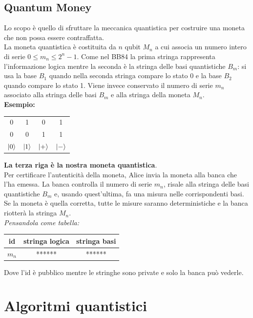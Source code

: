 \documentclass[12pt, a4paper]{report}
\begin{document}
\section{Quantum Money}
Lo scopo è quello di sfruttare la meccanica quantistica per costruire una moneta che non possa essere contraffatta.\\
La moneta quantistica è costituita da $n$ qubit $M_{n}$ a cui associa un numero intero di serie $0\leq m_{n} \leq 2^{n}-1$. Come nel BB84 la prima stringa rappresenta l'informazione logica mentre la seconda è la stringa delle basi quantistiche $B_{m}$: si usa la base $B_{1}$ quando nella seconda stringa compare  lo stato 0 e la base $B_{2}$ quando compare lo stato 1. Viene invece conservato il numero di serie $m_{n}$ associato alla stringa delle basi $B_{m}$ e alla stringa della moneta $M_{n}$.\\
\textbf{Esempio:}
\begin{center}
    \begin{tabular}{c c c c}
        0 & 1 & 0 & 1 \\
        0 & 0 & 1 & 1 \\
        $| 0 \rangle$ & $| 1 \rangle$ & $| + \rangle$ & $| - \rangle$ \\
    \end{tabular}
\end{center}
\textbf{La terza riga è la nostra moneta quantistica}.\\
Per certificare l'autenticità della moneta, Alice invia la moneta alla banca che l'ha emessa. La banca controlla il numero di serie $m_{n}$, risale alla stringa delle basi quantistiche $B_{m}$ e, usando quest'ultima, fa una misura nelle corrispondenti basi. Se la moneta è quella corretta, tutte le misure saranno deterministiche e la banca riotterà la stringa $M_{n}$.\\
\textit{Pensandola come tabella:}
\begin{center}
    \begin{tabular}{| c | c | c |}
        \hline
        \textbf{id} & \textbf{stringa logica} & \textbf{stringa basi} \\
        \hline
        $m_{n}$ & ****** & ****** \\
        \hline
    \end{tabular}
\end{center}
Dove l'id è pubblico mentre le stringhe sono private e solo la banca può vederle.
\chapter{Algoritmi quantistici}
\end{document}
